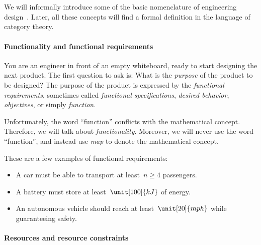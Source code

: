 

\section{}


We will informally introduce some of the basic nomenclature of engineering
design~\cite{antonsson2005formal,deweck2011}.
Later, all these concepts will find a formal
definition in the language of category theory.

\paragraph{Functionality and functional requirements} You are an engineer in front of an empty whiteboard, ready to start designing the next product.
The first question to ask is: What is the \emph{purpose} of the product to be designed?
The purpose of the product is expressed by the \emph{functional requirements}, sometimes called
\emph{functional specifications}, \emph{desired behavior}, \emph{objectives}, or simply \emph{function}.

Unfortunately, the word ``function'' conflicts with the mathematical concept.
Therefore, we will talk about \emph{functionality}. Moreover, we will never use the word ``function'', and instead use \emph{map} to denote the mathematical concept.

\begin{example}
    These are a few examples of functional requirements:
    \begin{itemize}
        \item A car must be able to transport at least~$n \geq 4$ passengers.
        \item A battery must store at least~$\unit[100]{kJ}$ of energy.
        \item An autonomous vehicle should reach at least~$\unit[20]{mph}$ while guaranteeing safety.
    \end{itemize}
\end{example}

\paragraph{Resources and resource constraints}


